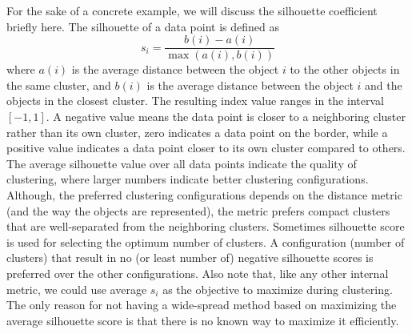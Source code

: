 \begin{marginfigure}
  \begin{center}
  \end{center}
  \caption{\label{fig:silhouette}%
    A schematic description of the silhouette metric.
    The metric tries to maximize the average distance of each data point
    (the data point labeled \num{3} in this example)
    to nearest cluster that it does not belong to (blue lines),
    and maximize the average distance of the data point to the others
    in the same cluster (red lines).
  }
\end{marginfigure}
For the sake of a concrete example,
we will discuss the silhouette coefficient briefly here.
The silhouette of a data point is defined as
\[
  s_{i} = \frac{b(i) - a(i)}{\max(a(i), b(i))}
\]
where $a(i)$ is the average distance
between the object $i$ to the other objects in the same cluster,
and $b(i)$ is the average distance
between the object $i$ and the objects in the closest cluster.
The resulting index value ranges in the interval $[-1, 1]$.
A negative value means the data point is closer to a neighboring cluster
rather than its own cluster,
zero indicates a data point on the border,
while a positive value indicates a data point closer to its own cluster
compared to others.
The average silhouette value over all data points indicate
the quality of clustering,
where larger numbers indicate better clustering configurations.
Although,
the preferred clustering configurations depends on the distance metric
(and the way the objects are represented),
the metric prefers compact clusters that are well-separated
from the neighboring clusters.
Sometimes silhouette score is used for selecting
the optimum number of clusters.
A configuration (number of clusters) that result in no (or least number of)
negative silhouette scores is preferred over the other configurations.
Also note that,
like any other internal metric, 
we could use average $s_{i}$ as the objective to maximize during clustering.
The only reason for not having a wide-spread method based on maximizing
the average silhouette score is 
that there is no known way to maximize it efficiently.

